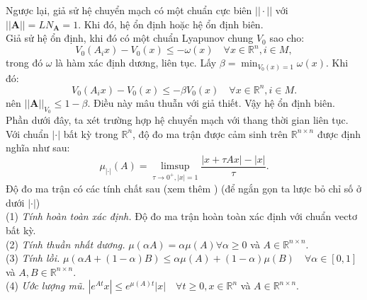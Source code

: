 \documentclass[14pt,a4paper,oneside]{report}		%
\theoremstyle{definition}
\begin{document}
Ngược lại, giả sử hệ chuyển mạch có một chuẩn cực biên $||\cdot||$ với $||\mathbf{A}||=LN_\mathbf{A}=1$. Khi đó, hệ ổn định hoặc hệ ổn định biên.\\
Giả sử hệ ổn định, khi đó có một chuẩn Lyapunov chung $V_0$ sao cho:
$$V_0(A_ix)-V_0(x)\leq -\omega (x)\quad\forall x\in\mathbb{R}^n,i\in M,$$
trong đó $\omega$ là hàm xác định dương, liên tục. Lấy $\beta =\min_{V_0(x)=1}\omega(x)$. Khi đó:
$$V_0(A_ix)-V_0(x)\leq -\beta V_0(x)\quad\forall x\in\mathbb{R}^n,i\in M.$$
nên $||\mathbf{A}||_{V_0}\leq 1-\beta$. Điều này mâu thuẫn với giả thiết. Vậy hệ ổn định biên.\\

Phần dưới đây, ta xét trường hợp hệ chuyển mạch với thang thời gian liên tục. Với chuẩn $|\cdot|$ bất kỳ trong $\mathbb{R}^n$, độ đo ma trận được cảm sinh trên $\mathbb{R}^{n\times n}$ được định nghĩa như sau:
\begin{equation} \label{eq2-39}
\mu_{|\cdot|}(A)=\limsup_{\tau \rightarrow 0^+,|x|=1}\frac{|x+\tau Ax|-|x|}{\tau}.
\end{equation}
Độ đo ma trận có các tính chất sau (xem thêm \cite{DATN3}) (để ngắn gọn ta lược bỏ chỉ số ở dưới $|\cdot|$)\\
(1) \textit{Tính hoàn toàn xác định.} Độ đo ma trận hoàn toàn xác định với chuẩn vectơ bất kỳ.\\
(2) \textit{Tính thuần nhất dương.} $\mu (\alpha A)=\alpha\mu (A)\forall\alpha\geq 0$ và $A\in\mathbb{R}^{n\times n}$.\\
(3) \textit{Tính lồi.} $\mu (\alpha A+(1-\alpha)B)\leq \alpha\mu(A)+(1-\alpha)\mu(B)\quad\forall\alpha\in [0,1]$ và $A,B\in\mathbb{R}^{n\times n}$.\\
(4) \textit{Ước lượng mũ.} $|e^{At}x|\leq e^{\mu (A)t}|x|\quad\forall t\geq 0,x\in\mathbb{R}^n$ và $A\in\mathbb{R}^{n\times n}$.\\
\end{document}

